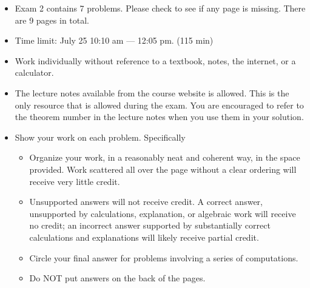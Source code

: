 \documentclass[12pt]{amsart}
\theoremstyle{definition}
\begin{document}


\vspace{3em}

\begin{itemize}
\item Exam 2 contains 7 problems. Please check to see if any page is missing. There are 9 pages in total.\vspace{1em}
\item Time limit: July 25 10:10 am --- 12:05 pm. (115 min)\vspace{1em}
\item Work individually without reference to a textbook, notes, the internet, or a calculator.\vspace{1em}
\item The lecture notes available from the course website is allowed. This is the only resource that is allowed during the exam. You are encouraged to refer to the theorem number in the lecture notes when you use them in your solution.\vspace{1em}
\item Show your work on each problem. Specifically\vspace{0.5em}
\begin{itemize}
\item Organize your work, in a reasonably neat and coherent way, in the space provided. Work scattered all over the page without a clear ordering
will receive very little credit.\vspace{0.5em}
\item Unsupported answers will not receive credit. A correct answer, unsupported by calculations, explanation, or algebraic work will receive no credit; an incorrect answer supported by substantially correct calculations and explanations will likely receive partial credit.\vspace{0.5em}
\item Circle your final answer for problems involving a series of computations.\vspace{0.5em}
\item Do NOT put answers on the back of the pages.
\end{itemize}
\end{itemize}



\vspace{2em}
\newpage
\end{document}
